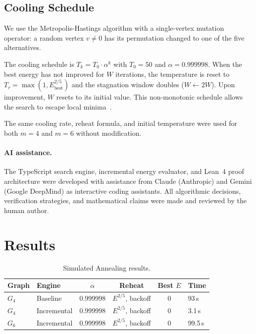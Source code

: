 \documentclass[11pt]{article}
\theoremstyle{plain}
\begin{document}
\subsection{Cooling Schedule}

We use the Metropolis-Hastings algorithm with a single-vertex mutation
operator: a random vertex $v \ne 0$ has its permutation changed to one of
the five alternatives.

The cooling schedule is $T_k = T_0 \cdot \alpha^k$ with $T_0 = 50$ and
$\alpha = 0.999998$. When the best energy has not improved for $W$
iterations, the temperature is reset to
$T_r = \max(1, E_{\text{best}}^{2/5})$ and the stagnation window doubles
($W \leftarrow 2W$). Upon improvement, $W$ resets to its initial value.
This non-monotonic schedule allows the search to escape local
minima~\cite{kirkpatrick1983,marinari1992}.

The same cooling rate, reheat formula, and initial temperature were used
for both $m=4$ and $m=6$ without modification.

\paragraph{AI assistance.}
The TypeScript search engine, incremental energy evaluator, and Lean~4 proof
architecture were developed with assistance from Claude (Anthropic) and
Gemini (Google DeepMind) as interactive coding assistants. All algorithmic
decisions, verification strategies, and mathematical claims were made and
reviewed by the human author.

\section{Results}

\begin{table}[h]
\centering
\caption{Simulated Annealing results.}
\label{tab:results}
\begin{tabular}{@{}llcccl@{}}
\toprule
Graph & Engine & $\alpha$ & Reheat & Best $E$ & Time \\
\midrule
$G_4$ & Baseline   & 0.999998 & $E^{2/5}$, backoff & 0 & 93\,s \\
$G_4$ & Incremental & 0.999998 & $E^{2/5}$, backoff & 0 & 3.1\,s \\
$G_6$ & Incremental & 0.999998 & $E^{2/5}$, backoff & 0 & 99.5\,s \\
\bottomrule
\end{tabular}
\end{table}
\end{document}
